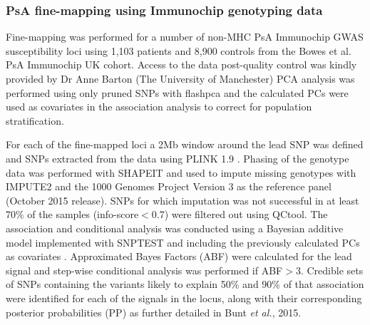 \subsubsection{PsA fine-mapping using Immunochip genotyping data}
Fine-mapping was performed for a number of non-MHC PsA Immunochip GWAS susceptibility loci using 1,103 patients and 8,900 controls from the Bowes {et al.} PsA Immunochip UK cohort. Access to the data post-quality control was kindly provided by Dr Anne Barton (The University of Manchester) PCA analysis was performed using only pruned SNPs with flashpca \parencite{Abraham2014} and the calculated PCs were used as covariates in the association analysis to correct for population stratification. 


For each of the fine-mapped loci a 2Mb window around the lead SNP was defined and SNPs extracted from the data using PLINK 1.9 \parencite{Chang2015}. Phasing of the genotype data was performed with SHAPEIT \parencite{Delaneau2012} and used to impute missing genotypes with IMPUTE2 \parencite{Howie2009} and the 1000 Genomes Project Version 3 as the reference panel (October 2015 release). SNPs for which imputation was not successful in at least 70\% of the samples (info-score$<$0.7) were filtered out using QCtool. The association and conditional analysis was conducted using a Bayesian additive model implemented with SNPTEST and including the previously calculated PCs as covariates \parencite{Burton2007}. Approximated Bayes Factors (ABF) were calculated for the lead signal and step-wise conditional analysis was performed if ABF$>$3. Credible sets of SNPs containing the variants likely to explain 50\% and 90\% of that association were identified for each of the signals in the locus, along with their corresponding posterior probabilities (PP) as further detailed in Bunt \textit{et al.}, 2015.

